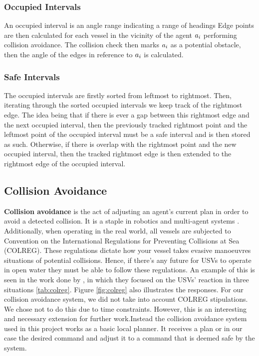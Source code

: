 \documentclass[bsc,frontabs,twoside,singlespacing,parskip,deptreport]{infthesis}     %
\begin{document}
\subsubsection{Occupied Intervals}
An occupied interval is an angle range indicating a range of headings 
 Edge points are then calculated for each vessel in the vicinity of the agent $a_{i}$ performing collision avoidance. The collision check then marks $a_{i}$ as a potential obstacle, then the angle of the edges in reference to $a_{i}$ is calculated. 

\subsubsection{Safe Intervals}
The occupied intervals are firstly sorted from leftmost to rightmost. Then, iterating through the sorted occupied intervals we keep track of the rightmost edge. The idea being that if there is ever a gap between this rightmost edge and the next occupied interval, then the previously tracked rightmost point and the leftmost point of the occupied interval must be a safe interval and is then stored as such. Otherwise, if there is overlap with the rightmost point and the new occupied interval, then the tracked rightmost edge is then extended to the rightmost edge of the occupied interval.

\subsection{Collision Avoidance}
\textbf{Collision avoidance} is the act of adjusting an agent's current plan in order to avoid a detected collision. It is a staple in robotics and multi-agent systems \cite{marzoughi2018collision, 4414258, kuwata2011safe, galabally2018collision}. Additionally, when operating in the real world, all vessels are subjected to Convention on the International Regulations for Preventing Collisions at Sea (COLREG). These regulations dictate how your vessel takes evasive manoeuvres situations of potential collisions. Hence, if there's any future for USVs to operate in open water they must be able to follow these regulations. An example of this is seen in the work done by \citet{kuwata2011safe}, in which they focused on the USVs' reaction in three situations \ref{tab:colreg}. Figure \ref{fig:colreg} also illustrates the responses. For our collision avoidance system, we did not take into account COLREG stipulations. We chose not to do this due to time constraints. However, this is an interesting and necessary extension for further work.Instead the collision avoidance system used in this project works as a basic local planner. It receives a plan or in our case the desired command and adjust it to a command that is deemed safe by the system.
\end{document}
